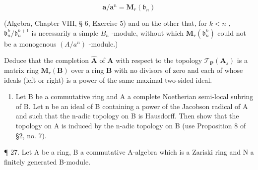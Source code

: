 \[
\mathbf {a} / \mathbf {a} ^ {n} = \mathbf {M} _ {r} (\mathfrak {b} _ {n})
\]

(Algebra, Chapter VIII, § 6, Exercise 5) and on the other that, for \(k < n\) , \(\mathfrak{b}_n^k / \mathfrak{b}_n^{k+1}\) is necessarily a simple \(B_n\) -module, without which \(\mathbf{M}_r(\mathfrak{b}_n^k)\) could not be a monogenous \((A / a^n)\) -module.)

Deduce that the completion \(\hat{\mathbf{A}}\) of \(\mathbf{A}\) with respect to the topology \(\mathcal{T}_{\mathbf{P}}(\mathbf{A}_s)\) is a matrix ring \(\mathbf{M}_r(\mathbf{B})\) over a ring \(\mathbf{B}\) with no divisors of zero and each of whose ideals (left or right) is a power of the same maximal two-sided ideal.

\begin{enumerate}
\def\labelenumi{\arabic{enumi}.}
\setcounter{enumi}{25}
\tightlist
\item
  Let B be a commutative ring and A a complete Noetherian semi-local subring of B. Let n be an ideal of B containing a power of the Jacobson radical of A and such that the n-adic topology on B is Hausdorff. Then show that the topology on A is induced by the n-adic topology on B (use Proposition 8 of §2, no. 7).
\end{enumerate}

¶ 27. Let A be a ring, B a commutative A-algebra which is a Zariski ring and N a finitely generated B-module.

